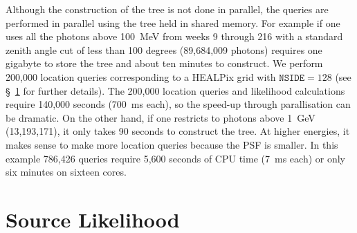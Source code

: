 \documentclass[useAMS,usenatbib]{mn2e}
\begin{document}
Although the construction of the tree is not done in parallel, the
queries are performed in parallel using the tree held in shared
memory.  For example if one uses all the photons above 100~MeV from
weeks 9 through 216 with a standard zenith angle cut of less than 100
degrees (89,684,009 photons) requires one gigabyte to store the tree
and about ten minutes to construct. We perform 200,000 location
queries corresponding to a HEALPix \citep{2005ApJ...622..759G} grid
with $\mathtt{NSIDE}=128$ (see \S~\ref{sec:source-likelihood} for
further details).  The 200,000 location queries and likelihood
calculations require 140,000 seconds (700~ms each), so the speed-up
through parallisation can be dramatic.  On the other hand, if one
restricts to photons above 1~GeV (13,193,171), it only takes 90
seconds to construct the tree.  At higher energies, it makes sense to
make more location queries because the PSF is smaller.  In this
example 786,426 queries require 5,600 seconds of CPU time (7~ms each)
or only six minutes on sixteen cores.

\section{Source Likelihood}
\label{sec:source-likelihood}
\end{document}
